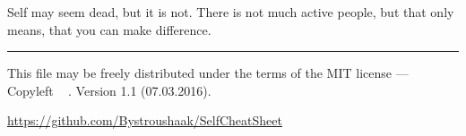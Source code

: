\documentclass[10pt]{article}
\begin{document}
\begin{multicols*}{3}
Self may seem dead, but it is not. There is not much active people, but that only means, that you can make difference.




\vspace*{0.4cm}
\hrule
\smallskip
{\small
This file may be freely distributed under
the terms of the MIT license ---
Copyleft \textcopyleft\ \thedate{} \href{http://kitakitsune.org}{\theauthor}. Version 1.1 (07.03.2016).

\url{https://github.com/Bystroushaak/SelfCheatSheet}
}

\end{multicols*}
\end{document}
